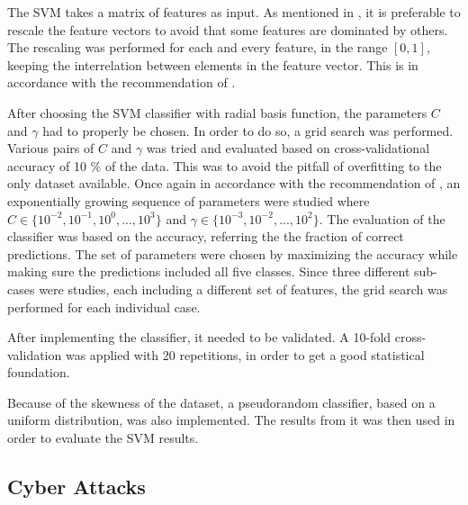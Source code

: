 The SVM takes a matrix of features as input. As mentioned in , it is preferable to rescale the feature vectors to avoid that some features are dominated by others. The rescaling was performed for each and every feature, in the range $[0,1]$, keeping the interrelation between elements in the feature vector. This is in accordance with the recommendation of \citet{Hsu10apractical}.

After choosing the SVM classifier with radial basis function, the parameters $C$ and $\gamma$ had to properly be chosen. In order to do so, a grid search was performed. Various pairs of $C$ and $\gamma$ was tried and evaluated based on cross-validational accuracy of 10 \% of the data. This was to avoid the pitfall of overfitting to the only dataset available. Once again in accordance with the recommendation of \citet{Hsu10apractical}, an exponentially growing sequence of parameters were studied where $C\in\{10^{-2},10^{-1},10^{0},...,10^{3}\}$ and $\gamma\in\{10^{-3},10^{-2},...,10^{2}\}$. The evaluation of the classifier was based on the accuracy, referring the the fraction of correct predictions. The set of parameters were chosen by maximizing the accuracy while making sure the predictions included all five classes. Since three different sub-cases were studies, each including a different set of features, the grid search was performed for each individual case. 

After implementing the classifier, it needed to be validated. A 10-fold cross-validation was applied with 20 repetitions, in order to get a good statistical foundation.

Because of the skewness of the dataset, a pseudorandom classifier, based on a uniform distribution, was also implemented.  The results from it was then used in order to evaluate the SVM results. 

\subsection{Cyber Attacks}\label{cyberattacks}



\newpage 
